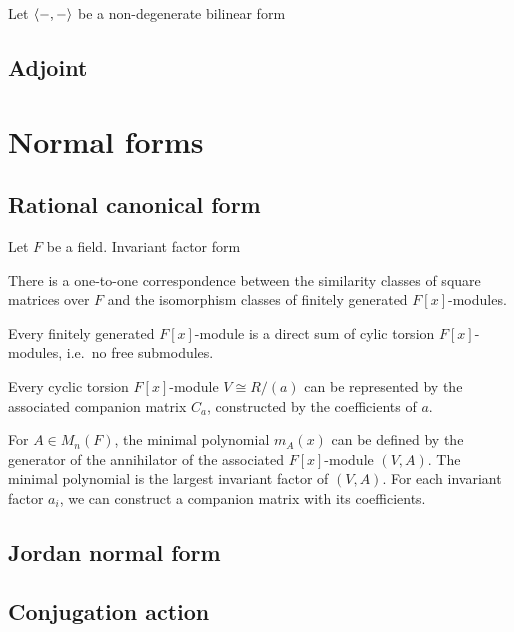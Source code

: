 \documentclass{../../large}
\begin{document}
\begin{prb}
Let $\langle-,-\rangle$ be a non-degenerate bilinear form
\end{prb}


\section{Adjoint}
\begin{prb}
\end{prb}








\chapter{Normal forms}
\section{Rational canonical form}
\begin{prb}
Let $F$ be a field.
Invariant factor form
\begin{parts}
\item There is a one-to-one correspondence between the similarity classes of square matrices over $F$ and the isomorphism classes of finitely generated $F[x]$-modules.
\item Every finitely generated $F[x]$-module is a direct sum of cylic torsion $F[x]$-modules, i.e.~no free submodules.
\item Every cyclic torsion $F[x]$-module $V\cong R/(a)$ can be represented by the associated companion matrix $C_a$, constructed by the coefficients of $a$.
\end{parts}
\end{prb}

For $A\in M_n(F)$, the minimal polynomial $m_A(x)$ can be defined by the generator of the annihilator of the associated $F[x]$-module $(V,A)$.
The minimal polynomial is the largest invariant factor of $(V,A)$.
For each invariant factor $a_i$, we can construct a companion matrix with its coefficients.



\section{Jordan normal form}


\section{Conjugation action}
\end{document}
